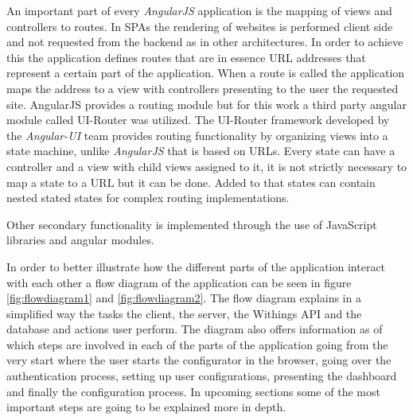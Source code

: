 \documentclass[../medieninformatik-arbeit.tex]{subfiles}
\begin{document}
An important part of every \textit{AngularJS} application is the mapping of views and controllers to routes. In SPAs the rendering of websites is performed client side and not requested from the backend as in other architectures. In order to achieve this the application defines routes that are in essence URL addresses that represent a certain part of the application. When a route is called the application maps the address to a view with controllers presenting to the user the requested site. AngularJS provides a routing module but for this work a third party angular module called UI-Router was utilized. The UI-Router framework developed by the \textit{Angular-UI} team\cite{ui-router} provides routing functionality by organizing views into a state machine, unlike \textit{AngularJS} that is based on URLs. Every state can have a controller and a view with child views assigned to it, it is not strictly necessary to map a state to a URL but it can be done. Added to that states can contain nested stated states for complex routing implementations. 

Other secondary functionality is implemented through the use of JavaScript libraries and angular modules. 

In order to better illustrate how the different parts of the application interact with each other a flow diagram of the application can be seen in figure \ref{fig:flowdiagram1} and \ref{fig:flowdiagram2}. The flow diagram explains in a simplified way the tasks the client, the server, the Withings API and the database and actions user perform. The diagram also offers information as of which steps are involved in each of the parts of the application going from the very start where the user starts the configurator in the browser, going over the authentication process, setting up user configurations, presenting the dashboard and finally the configuration process. In upcoming sections some of the most important steps are going to be explained more in depth.
\end{document}
